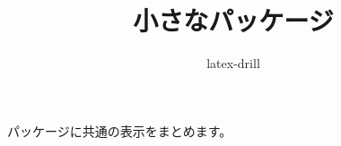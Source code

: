 \documentclass{jlreq}
\begin{document}
\title{小さなパッケージ}
\author{latex-drill}
\maketitle


\begin{drillquote}
パッケージに共通の表示をまとめます。
\end{drillquote}
\end{document}
